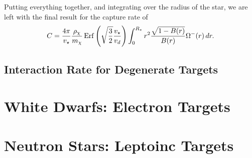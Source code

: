 Putting everything together, and integrating over the radius of the star, we are left with the final result for the capture rate of
\begin{equation}
    C =\frac{4\pi}{v_\star}\frac{\rho_\chi}{m_\chi} {\rm \,Erf}\left(\sqrt{\frac{3}{2}}\frac{v_\star}{v_d}\right) \int_0^{R_\star}  r^2\frac{\sqrt{1 - B(r)}}{B(r)}\Omega^-(r)\,dr.
\end{equation}

\subsection{Interaction Rate for Degenerate Targets}

\section{White Dwarfs: Electron Targets}

\section{Neutron Stars: Leptoinc Targets}
